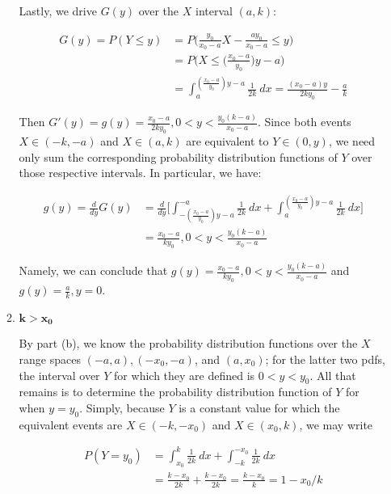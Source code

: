 \documentclass[10pt, oneside]{article}   	%
\theoremstyle{definition}
\begin{document}
\begin{enumerate}[label=5.\arabic*]
\begin{enumerate}
	Lastly, we drive $G(y)$ over the $X$ interval $(a, k)$:
	
	\begin{align*}
	G(y) = P(Y \leq y) &= P \Big(\frac{y_0}{x_0 - a} X - \frac{ay_0}{x_0 - a} \leq y \Big) \\
	&= P\Big(X \leq \Big( \frac{x_0 - a}{y_0} \Big) y - a \Big) \\
	&=  \int^{(\frac{x_0 - a}{y_0}) y - a}_a \frac{1}{2k} \ dx = \frac{(x_0 - a) y}{2ky_0} - \frac{a}{k}
	\end{align*}
	
	Then $G'(y) = g(y) = \boxed{ \frac{x_0 - a}{2ky_0} , 0 < y < \frac{y_0 (k - a)}{x_0 - a}}$. Since both events $X \in (-k, -a)$ and $X \in (a, k)$ are equivalent to $Y \in (0, y)$, we need only sum the corresponding probability distribution functions of $Y$ over those respective intervals. In particular, we have:
	
	\begin{align*}
	g(y) = \frac{d}{dy}G(y) &= \frac{d}{dy} \Bigg[ \int^{-a}_{-(\frac{x_0 - a}{y_0}) y - a} \frac{1}{2k} \ dx +  \int^{(\frac{x_0 - a}{y_0}) y - a}_a \frac{1}{2k} \ dx \Bigg] \\
	&= \frac{x_0 - a}{ky_0}, 0 < y < \frac{y_0 (k - a)}{x_0 - a}
	\end{align*}
	
	Namely, we can conclude that $\boxed{ g(y) = \frac{x_0 - a}{ky_0}, 0 < y < \frac{y_0 (k - a)}{x_0 - a}}$ and $\boxed{g(y) = \frac{a}{k}, y = 0}$.
	
	\item  \begin{tcolorbox}[
	  colback=Cerulean!5!white,
	  colframe=Cerulean!75!black]
	\textbf{$\bm{k > x_0}$}
	\end{tcolorbox}
	
	By part (b), we know the probability distribution functions over the $X$ range spaces $(-a,a), (-x_0, -a)$, and $(a, x_0)$; for the latter two pdfs, the interval over $Y$ for which they are defined is $0 < y < y_0$. All that remains is to determine the probability distribution function of $Y$ for when $y = y_0$. Simply, because $Y$ is a constant value for which the equivalent events are $X \in (-k, -x_0)$ and $X \in (x_0, k)$, we may write
	
	\begin{align*}
	P(Y = y_0) &= \int^k_{x_0} \frac{1}{2k} \ dx + \int^{-x_0}_{-k} \frac{1}{2k} \ dx \\
	&= \frac{k - x_0}{2k} + \frac{k - x_0}{2k} = \frac{k - x_0}{k} = 1 - x_0 / k
	\end{align*}
	

\end{enumerate}
\end{enumerate}
\end{document}
